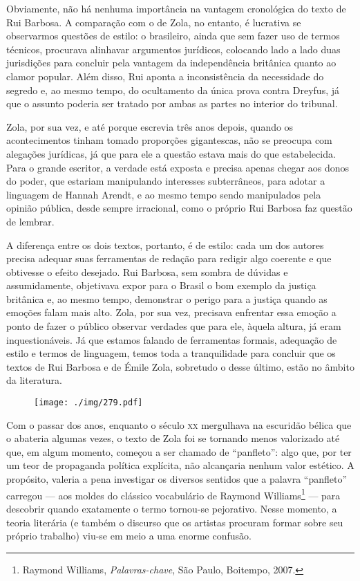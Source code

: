 Obviamente, não há nenhuma importância na vantagem cronológica do texto
de Rui Barbosa. A comparação com o de Zola, no entanto, é lucrativa se
observarmos questões de estilo: o brasileiro, ainda que sem fazer uso
de termos técnicos, procurava alinhavar argumentos jurídicos, colocando
lado a lado duas jurisdições para concluir pela vantagem da
independência britânica quanto ao clamor popular. Além disso, Rui
aponta a inconsistência da necessidade do segredo e, ao mesmo tempo, do
ocultamento da única prova contra Dreyfus, já que o assunto poderia ser
tratado por ambas as partes no interior do tribunal.

Zola, por sua vez, e até porque escrevia três anos depois, quando os
acontecimentos tinham tomado proporções gigantescas, não se preocupa
com alegações jurídicas, já que para ele a questão estava mais do que
estabelecida. Para o grande escritor, a verdade está exposta e precisa
apenas chegar aos donos do poder, que estariam manipulando interesses
subterrâneos, para adotar a linguagem de Hannah Arendt, e ao mesmo
tempo sendo manipulados pela opinião pública, desde sempre irracional,
como o próprio Rui Barbosa faz questão de lembrar.

A diferença entre os dois textos, portanto, é de estilo: cada um dos
autores precisa adequar suas ferramentas de redação para redigir algo
coerente e que obtivesse o efeito desejado. Rui Barbosa, sem sombra de
dúvidas e assumidamente, objetivava expor para o Brasil o bom
exemplo da justiça britânica e, ao mesmo tempo, demonstrar o perigo
para a justiça quando as emoções falam mais alto. Zola, por sua vez,
precisava enfrentar essa emoção a ponto de fazer o público observar
verdades que para ele, àquela altura, já eram inquestionáveis. Já que
estamos falando de ferramentas formais, adequação de estilo e termos de
linguagem, temos toda a tranquilidade para concluir que os textos de Rui
Barbosa e de Émile Zola, sobretudo o desse último, estão no âmbito da
literatura. 
\asterisc

\begin{figure}
\centering
\texttt{[image: ./img/279.pdf]}
\end{figure}

Com o passar dos anos, enquanto o século \textsc{xx} mergulhava na escuridão
bélica que o abateria algumas vezes, o texto de Zola foi se tornando
menos valorizado até que, em algum momento, começou a ser chamado de
“panfleto”: algo que, por ter um teor de propaganda política explícita,
não alcançaria nenhum valor estético. A propósito, valeria a pena
investigar os diversos sentidos que a palavra “panfleto” carregou --- aos
moldes do clássico vocabulário de Raymond Williams\footnote{
Raymond Williams, \textit{Palavras-chave}, São Paulo, Boitempo,
2007.} --- para descobrir quando exatamente o termo tornou-se
pejorativo. Nesse momento, a teoria literária (e também o discurso que
os artistas procuram formar sobre seu próprio trabalho) viu-se em
meio a uma enorme confusão.

